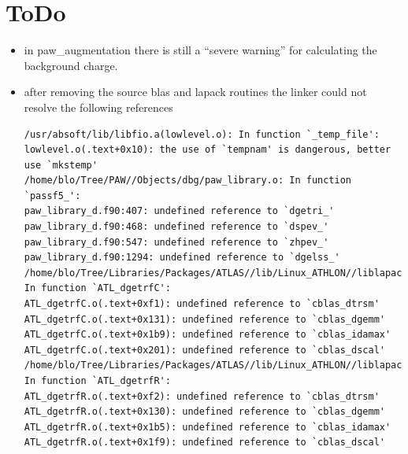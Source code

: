 \documentclass[final,12pt]{article}
\begin{document}
\section{ToDo}
\begin{itemize}
\item in paw\_augmentation there is still a ``severe warning'' for
calculating the background charge. 
\item after removing the source blas and lapack routines the linker
could not resolve the following references

\begin{verbatim}
/usr/absoft/lib/libfio.a(lowlevel.o): In function `_temp_file':
lowlevel.o(.text+0x10): the use of `tempnam' is dangerous, better use `mkstemp'
/home/blo/Tree/PAW//Objects/dbg/paw_library.o: In function `passf5_':
paw_library_d.f90:407: undefined reference to `dgetri_'
paw_library_d.f90:468: undefined reference to `dspev_'
paw_library_d.f90:547: undefined reference to `zhpev_'
paw_library_d.f90:1294: undefined reference to `dgelss_'
/home/blo/Tree/Libraries/Packages/ATLAS//lib/Linux_ATHLON//liblapack.a(ATL_dgetrfC.o): In function `ATL_dgetrfC':
ATL_dgetrfC.o(.text+0xf1): undefined reference to `cblas_dtrsm'
ATL_dgetrfC.o(.text+0x131): undefined reference to `cblas_dgemm'
ATL_dgetrfC.o(.text+0x1b9): undefined reference to `cblas_idamax'
ATL_dgetrfC.o(.text+0x201): undefined reference to `cblas_dscal'
/home/blo/Tree/Libraries/Packages/ATLAS//lib/Linux_ATHLON//liblapack.a(ATL_dgetrfR.o): In function `ATL_dgetrfR':
ATL_dgetrfR.o(.text+0xf2): undefined reference to `cblas_dtrsm'
ATL_dgetrfR.o(.text+0x130): undefined reference to `cblas_dgemm'
ATL_dgetrfR.o(.text+0x1b5): undefined reference to `cblas_idamax'
ATL_dgetrfR.o(.text+0x1f9): undefined reference to `cblas_dscal'        
\end{verbatim}
\end{itemize}
\end{document}
